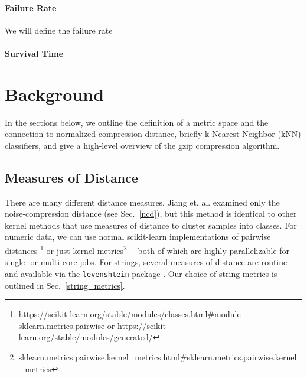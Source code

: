 \documentclass[sigconf]{acmart}
\begin{document}
\paragraph{Failure Rate}
We will define the failure rate
\paragraph{Survival Time}

\section{Background}

In the sections below, we outline the definition of a metric space and the connection to normalized compression distance, briefly k-Nearest Neighbor (kNN) classifiers, and give a high-level overview of the gzip compression algorithm.

\subsection{Measures of Distance}
There are many different distance measures. Jiang et. al. examined only the noise-compression distance (see Sec.~\ref{ncd}), but this method is identical to other kernel methods \cite{} that use measures of distance to cluster samples into classes. For numeric data, we can use normal scikit-learn implementations of pairwise distances \footnote{
https://scikit-learn.org/stable/modules/classes.html\#module-sklearn.metrics.pairwise or https://scikit-learn.org/stable/modules/generated/} or just kernel metrics\footnote{sklearn.metrics.pairwise.kernel\_metrics.html\#sklearn.metrics.pairwise.kernel\_metrics}--- both of which are highly parallelizable for single- or multi-core jobs. For strings, several measures of distance are routine and available via the \texttt{levenshtein} package \cite{levenshtein}. Our choice of string metrics is outlined in Sec.~\ref{string_metrics}.

    
    
\end{document}
